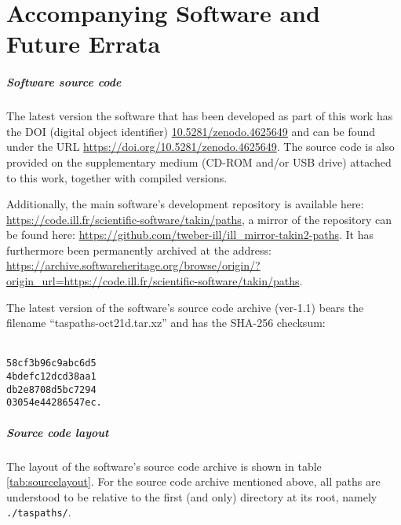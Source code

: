 %
%

\chapter{Accompanying Software and Future Errata}
\label{ch:online}

\paragraph{Software source code}
The latest version the software that has been developed 
as part of this work has the DOI (digital object identifier)
\href{https://doi.org/10.5281/zenodo.4625649}{10.5281/zenodo.4625649}
and can be found under the URL \url{https://doi.org/10.5281/zenodo.4625649}.
The source code is also provided on the supplementary medium (CD-ROM and/or USB drive) 
attached to this work, together with compiled versions.

Additionally, the main software's development repository is available here: 
\url{https://code.ill.fr/scientific-software/takin/paths},
a mirror of the repository can be found here: 
\url{https://github.com/tweber-ill/ill_mirror-takin2-paths}.
It has furthermore been permanently archived at the address:
\url{https://archive.softwareheritage.org/browse/origin/?origin_url=https://code.ill.fr/scientific-software/takin/paths}.

The latest version of the software's source code archive (ver-1.1) bears the
filename ``taspaths-oct21d.tar.xz'' and has the SHA-256 \cite{web_sha256sum}
checksum:

\begin{centering}
\texttt{\\
58cf3b96c9abc6d5\phantom{.} \\
4bdefc12dcd38aa1\phantom{.} \\
db2e8708d5bc7294\phantom{.} \\
03054e44286547ec.}\\
\end{centering}


\paragraph{Source code layout}
The layout of the software's source code archive is shown in table \ref{tab:sourcelayout}. 
For the source code archive mentioned above, all paths are understood to be relative to the first 
(and only) directory at its root, namely \lstinline|./taspaths/|.

